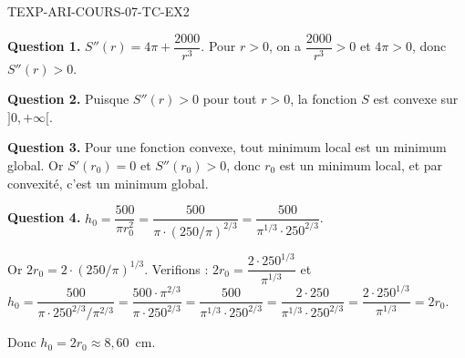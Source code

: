 \begin{corrige}{TEXP-ARI-COURS-07-TC-EX2}

\textbf{Question 1.} $S''(r) = 4\pi + \dfrac{2000}{r^3}$. Pour $r > 0$, on a $\dfrac{2000}{r^3} > 0$ et $4\pi > 0$, donc $S''(r) > 0$.

\textbf{Question 2.} Puisque $S''(r) > 0$ pour tout $r > 0$, la fonction $S$ est convexe sur $]0, +\infty[$.

\textbf{Question 3.} Pour une fonction convexe, tout minimum local est un minimum global. Or $S'(r_0) = 0$ et $S''(r_0) > 0$, donc $r_0$ est un minimum local, et par convexité, c'est un minimum global.

\textbf{Question 4.} $h_0 = \dfrac{500}{\pi r_0^2} = \dfrac{500}{\pi \cdot (250/\pi)^{2/3}} = \dfrac{500}{\pi^{1/3} \cdot 250^{2/3}}$.

Or $2r_0 = 2 \cdot (250/\pi)^{1/3}$. Verifions : $2r_0 = \dfrac{2 \cdot 250^{1/3}}{\pi^{1/3}}$ et $h_0 = \dfrac{500}{\pi \cdot 250^{2/3}/\pi^{2/3}} = \dfrac{500 \cdot \pi^{2/3}}{\pi \cdot 250^{2/3}} = \dfrac{500}{\pi^{1/3} \cdot 250^{2/3}} = \dfrac{2 \cdot 250}{\pi^{1/3} \cdot 250^{2/3}} = \dfrac{2 \cdot 250^{1/3}}{\pi^{1/3}} = 2r_0$.

Donc $h_0 = 2r_0 \approx 8{,}60$~cm.

\end{corrige}
